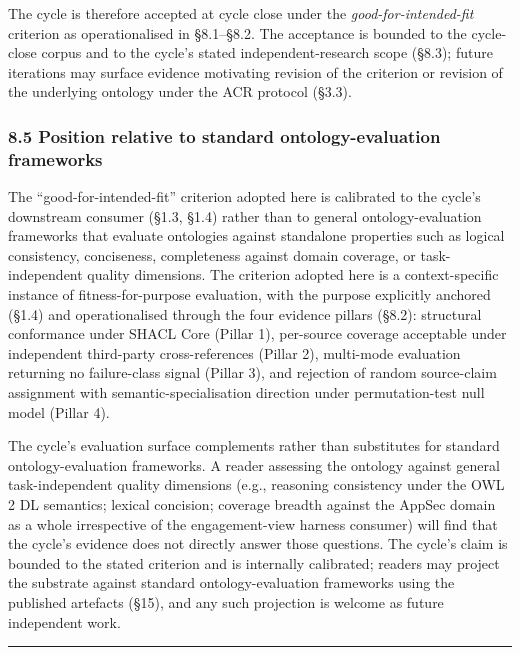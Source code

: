 \documentclass[
]{article}
\begin{document}
The cycle is therefore accepted at cycle close under the
\emph{good-for-intended-fit} criterion as operationalised in §8.1--§8.2.
The acceptance is bounded to the cycle-close corpus and to the cycle's
stated independent-research scope (§8.3); future iterations may surface
evidence motivating revision of the criterion or revision of the
underlying ontology under the ACR protocol (§3.3).

\subsubsection{8.5 Position relative to standard ontology-evaluation
frameworks}\label{position-relative-to-standard-ontology-evaluation-frameworks}

The ``good-for-intended-fit'' criterion adopted here is calibrated to
the cycle's downstream consumer (§1.3, §1.4) rather than to general
ontology-evaluation frameworks that evaluate ontologies against
standalone properties such as logical consistency, conciseness,
completeness against domain coverage, or task-independent quality
dimensions. The criterion adopted here is a context-specific instance of
fitness-for-purpose evaluation, with the purpose explicitly anchored
(§1.4) and operationalised through the four evidence pillars (§8.2):
structural conformance under SHACL Core (Pillar 1), per-source coverage
acceptable under independent third-party cross-references (Pillar 2),
multi-mode evaluation returning no failure-class signal (Pillar 3), and
rejection of random source-claim assignment with semantic-specialisation
direction under permutation-test null model (Pillar 4).

The cycle's evaluation surface complements rather than substitutes for
standard ontology-evaluation frameworks. A reader assessing the ontology
against general task-independent quality dimensions (e.g., reasoning
consistency under the OWL 2 DL semantics; lexical concision; coverage
breadth against the AppSec domain as a whole irrespective of the
engagement-view harness consumer) will find that the cycle's evidence
does not directly answer those questions. The cycle's claim is bounded
to the stated criterion and is internally calibrated; readers may
project the substrate against standard ontology-evaluation frameworks
using the published artefacts (§15), and any such projection is welcome
as future independent work.

\begin{center}\rule{0.5\linewidth}{0.5pt}\end{center}
\end{document}
